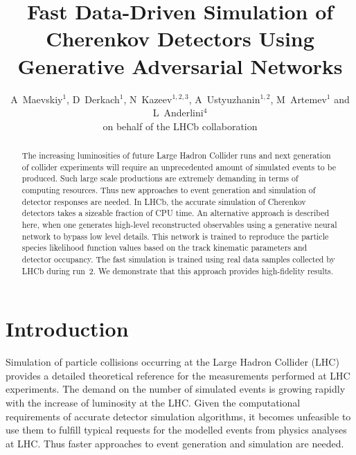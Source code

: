 \documentclass[a4paper]{jpconf}
\begin{document}
\title{Fast Data-Driven Simulation of Cherenkov Detectors Using Generative Adversarial Networks}

\author{A~Maevskiy$^1$, D~Derkach$^1$, N~Kazeev$^{1,2,3}$, A~Ustyuzhanin$^{1,2}$, M~Artemev$^1$ and L~Anderlini$^4$\\
on behalf of the LHCb collaboration}
\address{$^1$ Laboratory of Methods for Big Data Analysis, National Research University Higher School of Economics, 3~Kochnovsky Proezd, Moscow 125319, Russia}
\address{$^2$ The Yandex School of Data Analysis, 11/2~Timura Frunze St., Moscow 119021, Russia}
\address{$^3$ Department of Physics, Sapienza University of Rome,  5 Piazzale Aldo Moro, Rome 00185, Italy}
\address{$^4$ Istituto Nazionale di Fisica Nucleare, Sezione di Firenze, via G. Sansone 1, Sesto Fiorentino 50019, Italy}


\begin{abstract}
    The increasing luminosities of future Large Hadron Collider runs and next generation of collider experiments will require an unprecedented amount of simulated events to be produced. Such large scale productions are extremely demanding in terms of computing resources. Thus new approaches to event generation and simulation of detector responses are needed. In LHCb, the accurate simulation of Cherenkov detectors takes a sizeable fraction of CPU time. An alternative approach is described here, when one generates high-level reconstructed observables using a generative neural network to bypass low level details. This network is trained to reproduce the particle species likelihood function values based on the track kinematic parameters and detector occupancy. The fast simulation is trained using real data samples collected by LHCb during run~2. We demonstrate that this approach provides high-fidelity results.
\end{abstract}

\section{Introduction}

Simulation of particle collisions occurring at the Large Hadron Collider (LHC) provides a detailed theoretical reference for the measurements performed at LHC experiments.
The demand on the number of simulated events is growing rapidly with the increase of luminosity at the LHC. Given the computational requirements of accurate detector simulation algorithms, it becomes unfeasible to use them to fulfill typical requests for the modelled events from physics analyses at LHC. Thus faster approaches to event generation and simulation are needed.
\end{document}
